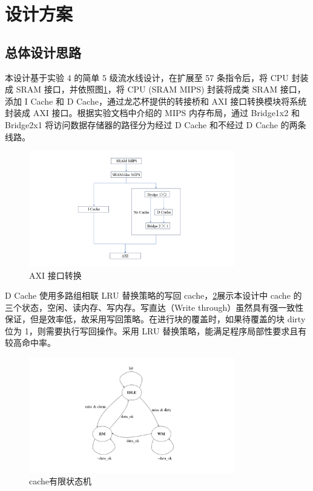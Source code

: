 \section{设计方案}
\subsection{总体设计思路}

本设计基于实验 4 的简单 5 级流水线设计，在扩展至 57 条指令后，将 CPU 封装成 SRAM 接口，并依照图\ref{fig:AXI}，将 CPU (SRAM MIPS) 封装将成类 SRAM 接口，添加 I Cache 和 D Cache，通过龙芯杯提供的转接桥和 AXI 接口转换模块将系统封装成 AXI 接口。根据实验文档中介绍的 MIPS 内存布局，通过 Bridge1x2 和 Bridge2x1 将访问数据存储器的路径分为经过 D Cache 和不经过 D Cache 的两条线路。

\begin{figure}[htbp]
    \centering
    \includegraphics[width=0.8\textwidth]{image/axi.PNG}
    \caption{ AXI 接口转换}
    \label{fig:AXI}
\end{figure}

D Cache 使用多路组相联 LRU 替换策略的写回 cache，\ref{fig:cache}展示本设计中 cache 的三个状态，空闲、读内存、写内存。写直达（Write through）虽然具有强一致性保证，但是效率低，故采用写回策略。在进行块的覆盖时，如果待覆盖的块 dirty 位为 1，则需要执行写回操作。采用 LRU 替换策略，能满足程序局部性要求且有较高命中率。

\begin{figure}[htbp]
    \centering
    \includegraphics[width=0.8\textwidth]{image/statetrans.PNG}
    \caption{cache有限状态机}
    \label{fig:cache}
\end{figure}

